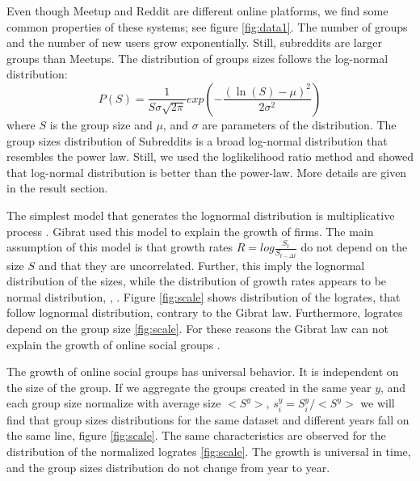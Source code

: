 Even though Meetup and Reddit are different online platforms, we find some common properties of these systems; see figure \ref{fig:data1}. The number of groups and the number of new users grow exponentially. Still, subreddits are larger groups than Meetups. The distribution of groups sizes follows the log-normal distribution:
\begin{equation}
P(S)=\frac{1}{S\sigma\sqrt{2\pi}}exp(-\frac{(\ln(S)-\mu)^{2}}{2\sigma^{2}})
\label{eq:log}
\end{equation}
where $S$ is the group size and $\mu$, and $\sigma$ are parameters of the distribution.
The group sizes distribution of Subreddits is a broad log-normal distribution that resembles the power law. Still, we used the loglikelihood ratio method and showed that log-normal distribution is better than the power-law. More details are given in the result section. 

The simplest model that generates the lognormal distribution is multiplicative process \cite{mitzenmacher2004brief}. Gibrat used this model to explain the growth of firms. The main assumption of this model is that growth rates  $R = log\frac{S_t}{S_{t-\Delta t}}$ do not depend on the size $S$ and that they are uncorrelated. Further, this imply the lognormal distribution of the sizes, while the distribution of growth rates appears to be normal distribution,  \cite{mondani2014fat}, \cite{fu2005growth}. Figure \ref{fig:scale} shows distribution of the logrates, that follow lognormal distribution, contrary to the Gibrat law. Furthermore, logrates depend on the group size \ref{fig:scale}. For these reasons the Gibrat law can not explain the growth of online social groups \cite{frasco2014spatially, qian2014origin}.    

The growth of online social groups has universal behavior. It is independent on the size of the group. If we aggregate the groups created in the same year $y$, and each group size normalize with average size $<S^y>$, $s^{y}_{i}=S^{y}_{i}/<S^{y}>$ we will find that group sizes distributions for the same dataset and different years fall on the same line, figure \ref{fig:scale}. The same characteristics are observed for the distribution of the normalized logrates \ref{fig:scale}. The growth is universal in time, and the group sizes distribution do not change from year to year.



